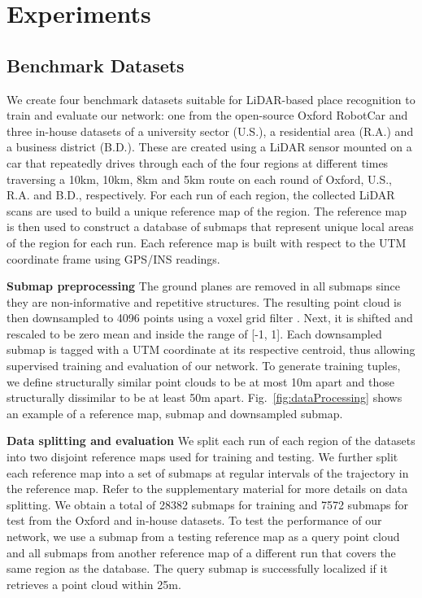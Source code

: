 \documentclass[10pt,twocolumn,letterpaper]{article}
\begin{document}
    

 	\section{Experiments}
\vspace{-0.1cm}
\subsection{Benchmark Datasets}
\vspace{-0.1cm}
We create four benchmark datasets suitable for LiDAR-based place recognition to train and evaluate our network: one from the open-source Oxford RobotCar \cite{RobotCarDatasetIJRR} and three in-house datasets of a university sector (U.S.), a residential area (R.A.) and a business district (B.D.).
These are created using a LiDAR sensor mounted on a car that repeatedly drives through each of the four regions at different times traversing a 10km, 10km, 8km and 5km route on each round of Oxford, U.S., R.A. and B.D., respectively. For each run of each region, the collected LiDAR scans are used to build a unique reference map of the region. The reference map is then used to construct a database of submaps that represent unique local areas of the region for each run. Each reference map is built with respect to the UTM coordinate frame using GPS/INS readings. 
\newline
\vspace{-0.3cm}

\noindent\textbf{Submap preprocessing} The ground planes are removed in all submaps since they are non-informative and repetitive structures. The resulting point cloud is then downsampled to 4096 points using a voxel grid filter \cite{Rusu_ICRA2011_PCL}. Next, it is shifted and rescaled to be zero mean and inside the range of [-1, 1]. Each downsampled submap is tagged with a UTM coordinate at its respective centroid, thus allowing supervised training and evaluation of our network. To generate training tuples, we define structurally similar point clouds to be at most 10m apart and those structurally dissimilar to be at least 50m apart. Fig.~\ref{fig:dataProcessing} shows an example of a reference map, submap and downsampled submap.
\newline
\vspace{-0.3cm}

\noindent\textbf{Data splitting and evaluation} 
We split each run of each region of the datasets into two disjoint reference maps used for training and testing. We further split each reference map into a set of submaps at regular intervals of the trajectory in the reference map. Refer to the supplementary material for more details on data splitting. We obtain a total of 28382 submaps for training and 7572 submaps for test from the Oxford and in-house datasets. To test the performance of our network, we use a submap from a testing reference map as a query point cloud and all submaps from another reference map of a different run that covers the same region as the database. The query submap is successfully localized if it retrieves a point cloud within 25m.
\newline
\vspace{-0.3cm}
\end{document}

